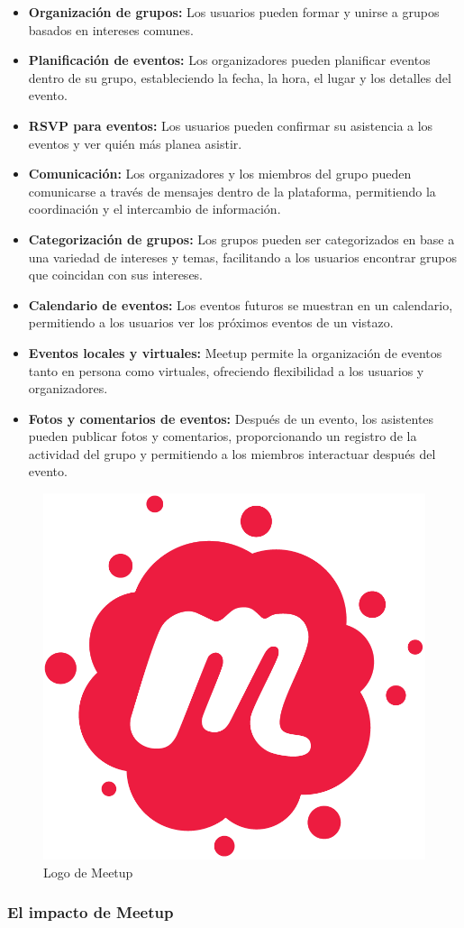 \begin{itemize}
  \item \textbf{Organización de grupos:} Los usuarios pueden formar y unirse a grupos basados en intereses comunes.
  \item \textbf{Planificación de eventos:} Los organizadores pueden planificar eventos dentro de su grupo, estableciendo 
  la fecha, la hora, el lugar y los detalles del evento.
  \item \textbf{RSVP para eventos:} Los usuarios pueden confirmar su asistencia a los eventos y ver quién más planea asistir.
  \item \textbf{Comunicación:} Los organizadores y los miembros del grupo pueden comunicarse a través de mensajes dentro de 
  la plataforma, permitiendo la coordinación y el intercambio de información.
  \item \textbf{Categorización de grupos:} Los grupos pueden ser categorizados en base a una variedad de intereses y 
  temas, facilitando a los usuarios encontrar grupos que coincidan con sus intereses.
  \item \textbf{Calendario de eventos:} Los eventos futuros se muestran en un calendario, permitiendo a los usuarios 
  ver los próximos eventos de un vistazo.
  \item \textbf{Eventos locales y virtuales:} Meetup permite la organización de eventos tanto en persona como virtuales, 
  ofreciendo flexibilidad a los usuarios y organizadores.
  \item \textbf{Fotos y comentarios de eventos:} Después de un evento, los asistentes pueden publicar fotos y 
  comentarios, proporcionando un registro de la actividad del grupo y permitiendo a los miembros interactuar después del evento.
\end{itemize}
\begin{figure}[H]
        \centering
        \includegraphics[width=0.3\linewidth]{images/Meetup_Logo.png}
        \caption{Logo de Meetup}
        \label{fig:meetup_logo}
    \end{figure}

\subsubsection{El impacto de Meetup}

